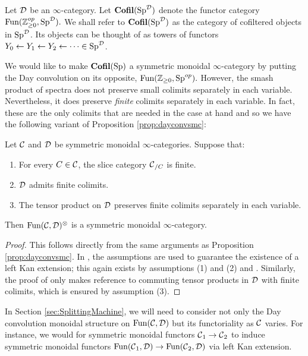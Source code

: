 \begin{dfn}Let $\operatorname{\mathcal{D}}$ be an $\infty$-category.  Let $\operatorname{\textbf{Cofil}}(\operatorname{\text{Sp}}^{\operatorname{\mathcal{D}}})$ denote the functor category $\operatorname{\text{Fun}}(\operatorname{\mathbb{Z}}_{\geq 0}^{op}, \operatorname{\text{Sp}}^{\operatorname{\mathcal{D}}}).$  We shall refer to $\operatorname{\textbf{Cofil}}(\operatorname{\text{Sp}}^{\operatorname{\mathcal{D}}})$ as the category of cofiltered objects in $\operatorname{\text{Sp}}^{\operatorname{\mathcal{D}}}$.  Its objects can be thought of as towers of functors $Y_0\leftarrow Y_1\leftarrow Y_2 \leftarrow \cdots \in \operatorname{\text{Sp}}^{\operatorname{\mathcal{D}}}$.
\end{dfn}

We would like to make $\operatorname{\textbf{Cofil}}(\operatorname{\text{Sp}})$ a symmetric monoidal $\infty$-category by putting the Day convolution on its opposite, $\operatorname{\text{Fun}}(\operatorname{\mathbb{Z}}_{\geq 0}, \operatorname{\text{Sp}}^{op}).$  However, the smash product of spectra does not preserve small colimits separately in each variable.  Nevertheless, it does preserve \emph{finite} colimits separately in each variable.  In fact, these are the only colimits that are needed in the case at hand and so we have the following variant of Proposition \ref{prop:dayconvsmc}:

\begin{var}\label{var:day}
Let $\operatorname{\mathcal{C}}$ and $\operatorname{\mathcal{D}}$ be symmetric monoidal $\infty$-categories.  Suppose that:
\begin{enumerate}
\item For every $C\in \operatorname{\mathcal{C}}$, the slice category $\operatorname{\mathcal{C}}_{/C}$ is finite.  
\item $\operatorname{\mathcal{D}}$ admits finite colimits. 
\item The tensor product on $\operatorname{\mathcal{D}}$ preserves finite colimits separately in each variable.  
\end{enumerate}
Then $\operatorname{\text{Fun}}(\operatorname{\mathcal{C}}, \operatorname{\mathcal{D}})^{\otimes}$ is a symmetric monoidal $\infty$-category.  
\end{var}
\begin{proof}
This follows directly from the same arguments as Proposition \ref{prop:dayconvsmc}.  In \cite[Corollary 2.2.6.14]{HA}, the assumptions are used to guarantee the existence of a left Kan extension; this again exists by assumptions (1) and (2) and \cite[Lemma 4.3.2.13]{HTT}.  Similarly, the proof of \cite[Proposition 2.2.6.16]{HA} only makes reference to commuting tensor products in $\operatorname{\mathcal{D}}$ with finite colimits, which is ensured by assumption (3).  
\end{proof}


In Section \ref{sec:SplittingMachine}, we will need to consider not only the Day convolution monoidal structure on $\operatorname{\text{Fun}}(\operatorname{\mathcal{C}},\operatorname{\mathcal{D}})$ but its functoriality as $\operatorname{\mathcal{C}}$ varies.  For instance, we would for symmetric monoidal functors $\operatorname{\mathcal{C}}_1 \to \operatorname{\mathcal{C}}_2$ to induce symmetric monoidal functors $\operatorname{\text{Fun}}(\operatorname{\mathcal{C}}_1,\operatorname{\mathcal{D}}) \to \operatorname{\text{Fun}}(\operatorname{\mathcal{C}}_2,\operatorname{\mathcal{D}})$ via left Kan extension.  

